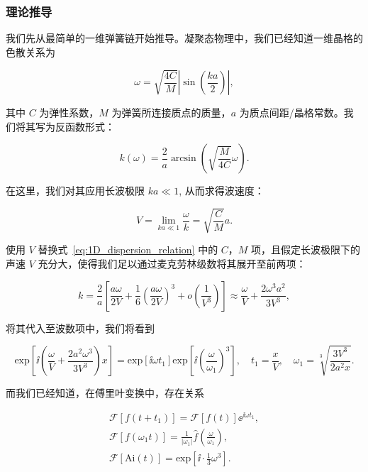 \subsubsection{理论推导}

我们先从最简单的一维弹簧链开始推导。凝聚态物理中，我们已经知道一维晶格的色散关系为

\begin{equation}
  \omega=\sqrt{\frac{4C}{M}}\left|\sin\left(\frac{ka}{2}\right)\right|,
\end{equation}

其中 $C$ 为弹性系数，$M$ 为弹簧所连接质点的质量，$a$ 为质点间距/晶格常数。我们将其写为反函数形式：

\begin{equation}
  k(\omega) = \frac{2}{a}\arcsin{\left(\sqrt{\frac{M}{4C}}\omega\right)}.\label{eq:1D_dispersion_relation}
\end{equation}

在这里，我们对其应用长波极限 $ka\ll 1$, 从而求得波速度：

\begin{equation}
  V = \lim_{ka\ll 1}\frac{\omega}{k} = \sqrt{\frac{C}{M}}a.
\end{equation}

使用 $V$ 替换式~\eqref{eq:1D_dispersion_relation} 中的 $C$，$M$ 项，且假定长波极限下的声速 $V$ 充分大，使得我们足以通过麦克劳林级数将其展开至前两项：

\begin{equation}
  k = \frac{2}{a}\left[\frac{a\omega}{2V} + \frac{1}{6}\left(\frac{a\omega}{2V}\right)^{3} + o\left(\frac{1}{V^3}\right)\right]\approx\frac{\omega}{V} + \frac{2\omega^{3}a^{2}}{3V^{3}},
\end{equation}

将其代入至波数项中，我们将看到

\begin{equation}
  \text{exp}\left[{\ii \left(\frac{\omega}{V} + \frac{2a^{2}\omega^{3}}{3V^{3}}\right)x}\right] = \text{exp}[{\ii\omega t_{1}}]\text{exp}\left[{\ii\left(\frac{\omega}{\omega_{1}}\right)^{3}}\right],\quad t_{1} = \frac{x}{V},\quad \omega_{1} = \sqrt[3]{\frac{3V^{3}}{2a^{2}x}}.
\end{equation}

而我们已经知道，在傅里叶变换中，存在关系

\begin{align}
  \mathcal{F}[f(t+t_{1})] = \mathcal{F}[f(t)]{\ee}^{\ii\omega t_{1}},\label{eq:translation_property}\\
  \mathcal{F}[f(\omega_{1}t)] = \frac{1}{|\omega_{1}|}\hat{f}\left(\frac{\omega}{\omega_{1}}\right),\label{eq:scale_property}\\
  \mathcal{F}[\text{Ai}(t)] = \text{exp}\left[\ii\cdot \frac{1}{3}\omega^3\right].
\end{align}


